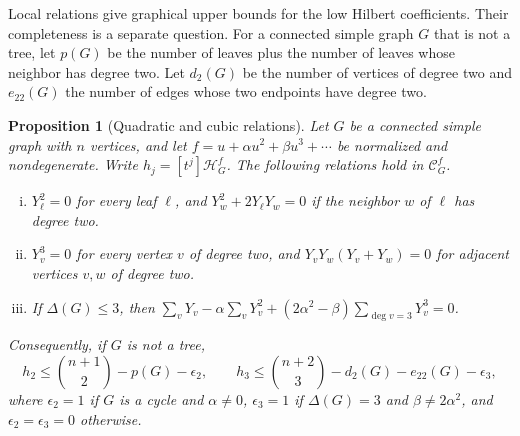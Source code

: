 \documentclass[reqno]{article}
\theoremstyle{plain} %
\newtheorem{proposition}[theorem]{Proposition}
\theoremstyle{definition}
\theoremstyle{remark}
\newcommand {\CC}{\mathscr{C}}
\newcommand{\hs}{\mathscr{H}}
\numberwithin{equation}{section}
\begin{document}
Local relations give graphical upper bounds for the low Hilbert
coefficients. Their completeness is a separate question. For a connected
simple graph $G$ that is not a tree, let $p(G)$ be the
number of leaves plus the number of leaves whose neighbor has degree two.
Let $d_2(G)$ be the number of vertices of degree two and $e_{22}(G)$
the number of edges whose two endpoints have degree two.

\begin{proposition}[Quadratic and cubic relations]
\label{prop:low-relations}
Let $G$ be a connected simple graph with $n$ vertices, and let
$f=u+\alpha u^2+\beta u^3+\cdots$ be normalized and nondegenerate.
Write $h_j=[t^j]\hs_G^f$. The following relations hold in $\CC_G^f$.
\begin{enumerate}[(i)]
\item $Y_\ell^2=0$ for every leaf $\ell$, and
$Y_w^2+2Y_\ell Y_w=0$ if the neighbor $w$ of $\ell$ has degree two.
\item $Y_v^3=0$ for every vertex $v$ of degree two, and
$Y_vY_w(Y_v+Y_w)=0$ for adjacent vertices $v,w$ of degree two.
\item If $\Delta(G)\le3$, then
$\sum_vY_v-\alpha\sum_vY_v^2+(2\alpha^2-\beta)\sum_{\deg v=3}Y_v^3=0$.
\end{enumerate}
Consequently, if $G$ is not a tree,
\begin{equation}\label{eq:low-bounds}
h_2\le\binom{n+1}2-p(G)-\epsilon_2,\qquad
h_3\le\binom{n+2}3-d_2(G)-e_{22}(G)-\epsilon_3,
\end{equation}
where $\epsilon_2=1$ if $G$ is a cycle and $\alpha\ne0$, $\epsilon_3=1$ if
$\Delta(G)=3$ and $\beta\ne2\alpha^2$, and $\epsilon_2=\epsilon_3=0$
otherwise.
\end{proposition}
\end{document}
